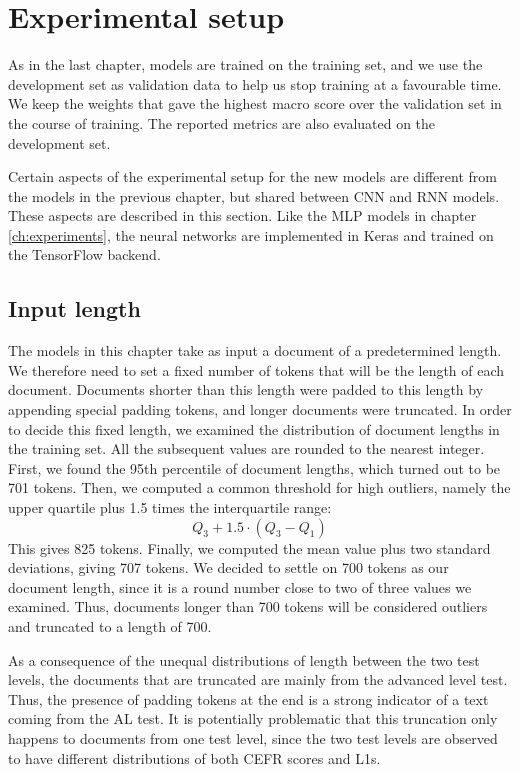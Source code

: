 \section{Experimental setup}

As in the last chapter, models are trained on the training set, and we use
the development set as validation data to help us stop training at a
favourable time. We keep the weights that gave the highest macro \FI score
over the validation set in the course of training. The reported metrics are
also evaluated on the development set.

Certain aspects of the experimental setup for the new models are different
from the models in the previous chapter, but shared between \ac{CNN} and
\ac{RNN} models. These aspects are described in this section. Like the
\ac{MLP} models in chapter \ref{ch:experiments}, the neural networks are
implemented in Keras \autocite{keras} and trained on the TensorFlow
\autocite{tensorflow} backend.


\subsection{Input length}

The models in this chapter take as input a document of a predetermined
length. We therefore need to set a fixed number of tokens that will be the
length of each document. Documents shorter than this length were padded to
this length by appending special padding tokens, and longer documents were
truncated. In order to decide this fixed length, we examined the distribution
of document lengths in the training set. All the subsequent values are
rounded to the nearest integer. First, we found the 95th percentile of
document lengths, which turned out to be 701 tokens. Then, we computed a
common threshold for high outliers, namely the upper quartile plus 1.5 times
the interquartile range:
\[
  Q_3 + 1.5 \cdot (Q_3 - Q_1)
\]
This gives 825 tokens. Finally, we computed the mean value plus two standard
deviations, giving 707 tokens. We decided to settle on 700 tokens as our
document length, since it is a round number close to two of three values we
examined. Thus, documents longer than 700 tokens will be considered outliers
and truncated to a length of 700.

As a consequence of the unequal distributions of length between the two test
levels, the documents that are truncated are mainly from the advanced level
test. Thus, the presence of padding tokens at the end is a strong indicator
of a text coming from the AL test. It is potentially problematic that this
truncation only happens to documents from one test level, since the two test
levels are observed to have different distributions of both CEFR scores and
\acp{L1}.


